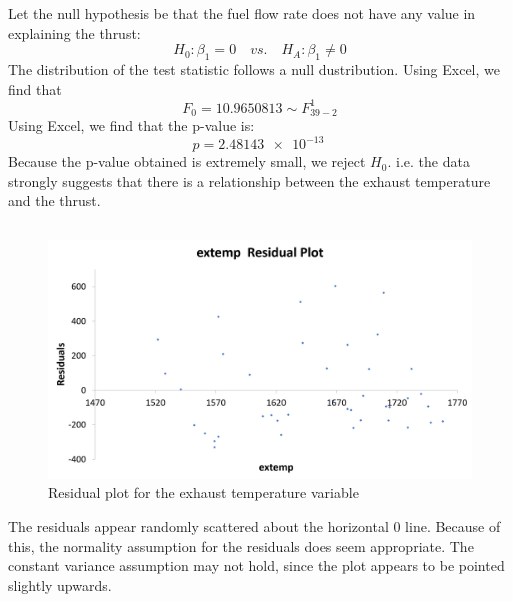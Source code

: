 \documentclass[letterpaper]{article}
\begin{document}
Let the null hypothesis be that the fuel flow rate does not have any value in explaining the thrust:
$$ H_0: \beta_1 =0 \quad vs. \quad H_A: \beta_1 \neq 0 $$
The distribution of the test statistic follows a null dustribution.
Using Excel, we find that
$$F_0 = 10.9650813 \sim F_{39-2}^{1}$$
Using Excel, we find that the p-value is:
$$p= \SI{2.48143e-13}{} $$
Because the p-value obtained is extremely small, we reject $H_0$. i.e. the data strongly suggests that there is a relationship between the exhaust temperature and the thrust.

\setcounter{subsection}{6}
\subsection{}

\begin{figure}[H]
 \centering
 \includegraphics[width=\textwidth]{extempresidual.png}
 \caption{Residual plot for the exhaust temperature variable}
\end{figure}
The residuals appear randomly scattered about the horizontal 0 line.
Because of this, the normality assumption for the
residuals does seem appropriate.
The constant variance assumption may not hold, since
the plot appears to be pointed slightly upwards.

\end{document}
